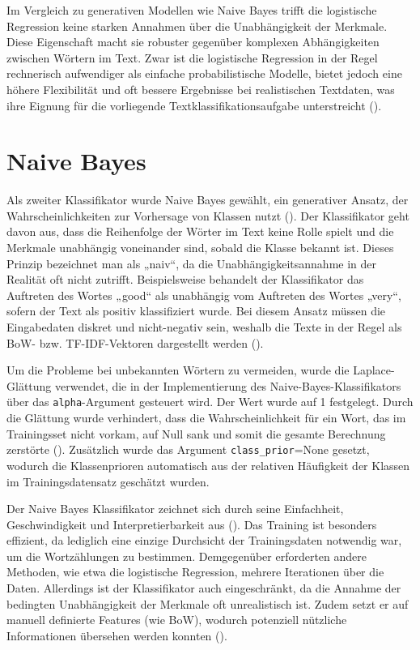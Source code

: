 Im Vergleich zu generativen Modellen wie Naive Bayes trifft die logistische 
Regression keine starken Annahmen über die Unabhängigkeit der Merkmale. Diese 
Eigenschaft macht sie robuster gegenüber komplexen Abhängigkeiten zwischen Wörtern 
im Text. Zwar ist die logistische Regression in der Regel rechnerisch aufwendiger 
als einfache probabilistische Modelle, bietet jedoch eine höhere Flexibilität und 
oft bessere Ergebnisse bei realistischen Textdaten, was ihre Eignung für die 
vorliegende Textklassifikationsaufgabe unterstreicht (\cite{linkedin2024}). 

\section{Naive Bayes}
Als zweiter Klassifikator wurde Naive Bayes gewählt, ein generativer
Ansatz, der Wahrscheinlichkeiten zur Vorhersage von Klassen nutzt
(\cite{voita2024textclass}). Der Klassifikator geht davon aus, dass die Reihenfolge der 
Wörter im Text keine Rolle spielt und die Merkmale unabhängig voneinander sind, 
sobald die Klasse bekannt ist. Dieses 
Prinzip bezeichnet man als „naiv“, da die Unabhängigkeitsannahme in der 
Realität oft nicht zutrifft. Beispielsweise behandelt der Klassifikator das 
Auftreten des Wortes „good“ als unabhängig vom Auftreten des Wortes „very“, 
sofern der Text als positiv klassifiziert wurde. Bei diesem Ansatz
müssen die Eingabedaten diskret und nicht-negativ sein, weshalb die Texte in der 
Regel als BoW- bzw. TF-IDF-Vektoren dargestellt werden (\cite{voita2024textclass}).

Um die Probleme bei unbekannten Wörtern zu vermeiden, wurde die 
Laplace-Glättung verwendet, die in der Implementierung des Naive-Bayes-Klassifikators 
über das \texttt{alpha}-Argument gesteuert wird. Der Wert wurde auf 1 festgelegt. 
Durch die Glättung wurde 
verhindert, dass die Wahrscheinlichkeit für ein Wort, das im Trainingsset nicht 
vorkam, auf Null sank und somit die gesamte Berechnung zerstörte (\cite[Kapitel B]{jurafsky2023}).
Zusätzlich wurde das Argument \texttt{class\_prior}=None gesetzt, 
wodurch die Klassenprioren automatisch aus der relativen Häufigkeit der Klassen 
im Trainingsdatensatz geschätzt wurden.

Der Naive Bayes Klassifikator zeichnet sich durch seine Einfachheit, 
Geschwindigkeit und Interpretierbarkeit aus (\cite[Kapitel B]{jurafsky2023}). Das Training ist 
besonders effizient, da lediglich eine einzige Durchsicht der Trainingsdaten 
notwendig war, um die Wortzählungen zu bestimmen. Demgegenüber erforderten 
andere Methoden, wie etwa die logistische Regression, mehrere Iterationen über 
die Daten.
Allerdings ist der Klassifikator auch eingeschränkt, da die Annahme der 
bedingten Unabhängigkeit der Merkmale oft unrealistisch ist. Zudem setzt er 
auf manuell definierte Features (wie BoW), wodurch potenziell nützliche 
Informationen übersehen werden konnten (\cite[Kapitel B]{jurafsky2023}).


